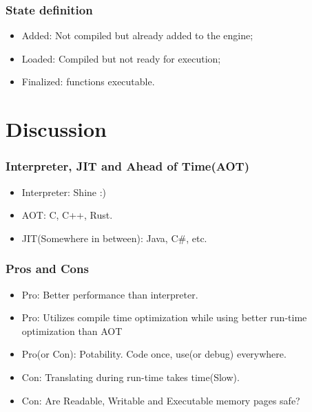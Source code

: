 \documentclass{beamer}
\begin{document}
\begin{frame}
\frametitle{State definition}
\begin{itemize}
	\item Added: Not compiled but already added to the engine;
	\item Loaded: Compiled but not ready for execution;
	\item Finalized: functions executable.
\end{itemize}
\end{frame}

\section{Discussion}

\begin{frame}
\frametitle{Interpreter, JIT and Ahead of Time(AOT)}
\begin{itemize}
	\item Interpreter: Shine :)
	\item AOT: C, C++, Rust.
	\item JIT(Somewhere in between): Java, C\#, etc.
\end{itemize}
\end{frame}

\begin{frame}
\frametitle{Pros and Cons}
\begin{itemize}
	\item Pro: Better performance than interpreter.
	\item Pro: Utilizes compile time optimization while using better run-time optimization than AOT
	\item Pro(or Con): Potability. Code once, use(or debug) everywhere.
	\item Con: Translating during run-time takes time(Slow).
	\item Con: Are Readable, Writable and Executable memory pages safe?
\end{itemize}
\end{frame}

\end{document}
